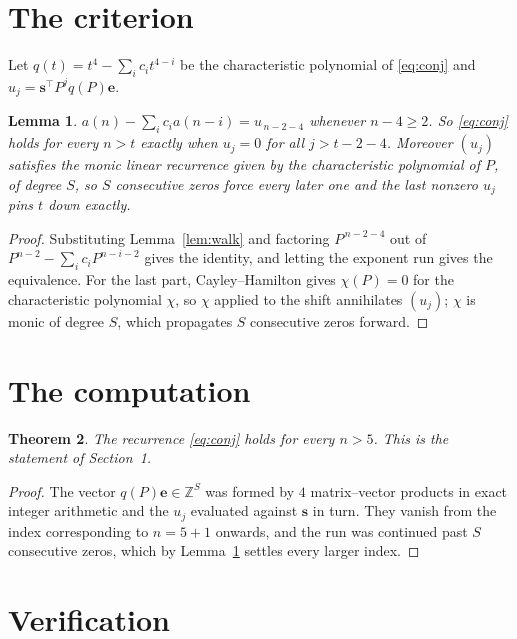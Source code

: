 \documentclass[11pt,a4paper]{article}
\theoremstyle{plain}
\newtheorem{theorem}{Theorem}
\newtheorem{lemma}[theorem]{Lemma}
\theoremstyle{definition}
\begin{document}
\section{The criterion}

Let $q(t)=t^{4}-\sum_i c_i t^{4-i}$ be the characteristic polynomial of
\eqref{eq:conj} and $u_j=\mathbf{s}^{\!\top}P^{j}q(P)\mathbf{e}$.

\begin{lemma}\label{lem:crit}
$a(n)-\sum_i c_i a(n-i)=u_{\,n-2-4}$ whenever $n-4\ge2$. So \eqref{eq:conj}
holds for every $n>t$ exactly when $u_j=0$ for all $j>t-2-4$. Moreover $(u_j)$
satisfies the monic linear recurrence given by the characteristic polynomial of $P$, of
degree $S$, so $S$ consecutive zeros force every later one and the last nonzero $u_j$ pins
$t$ down exactly.
\end{lemma}

\begin{proof}
Substituting Lemma~\ref{lem:walk} and factoring $P^{\,n-2-4}$ out of
$P^{n-2}-\sum_i c_i P^{n-i-2}$ gives the identity, and letting the exponent run gives the
equivalence. For the last part, Cayley--Hamilton gives $\chi(P)=0$ for the characteristic
polynomial $\chi$, so $\chi$ applied to the shift annihilates $(u_j)$; $\chi$ is monic of
degree $S$, which propagates $S$ consecutive zeros forward.
\end{proof}

\section{The computation}

\begin{theorem}
The recurrence \eqref{eq:conj} holds for every $n>5$. This is the statement of
Section~1.
\end{theorem}

\begin{proof}
The vector $q(P)\mathbf{e}\in\mathbb{Z}^{S}$ was formed by $4$ matrix--vector
products in exact integer arithmetic and the $u_j$ evaluated against $\mathbf{s}$ in turn.
They vanish from the index corresponding to $n=5+1$ onwards, and the run was continued
past $S$ consecutive zeros, which by Lemma~\ref{lem:crit} settles every larger index.
\end{proof}

\section{Verification}
\end{document}
